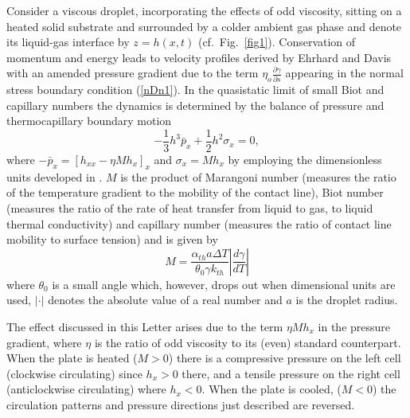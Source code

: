 \documentclass[%
 amsmath,amssymb,
 aps,
10.5pt]{revtex4-2}
\def\rr#1{(\ref{#1})}
\newcommand{\be}{\begin{equation}}
\newcommand{\ee}{\end{equation}}
\begin{document}
Consider a viscous droplet, incorporating the effects of odd viscosity, sitting on a heated solid substrate and 
surrounded by a colder ambient gas phase and denote its liquid-gas interface by $z=h(x,t)$ (cf.~Fig.~\ref{fig1}).    
Conservation of momentum and energy
leads to velocity profiles derived by Ehrhard and Davis \cite[Eq.~(4.11p)]{Ehrhard1991}
with an amended pressure gradient due to the term $\eta_o\frac{\partial \gamma}{\partial s}$
appearing in the normal stress boundary condition \rr{nDn1}. 
In the quasistatic limit of small Biot and capillary numbers 
the dynamics is determined by the balance of pressure and thermocapillary boundary
motion
\be\label{bal2}
-\frac{1}{3}h^3 \bar p_x + \frac{1}{2}h^2\sigma_x =0,
\ee
where 
$-\bar p_x=\left[ h_{xx} - \eta {M h_x}
\right]_x$ and $\sigma_x = Mh_x$ by employing the dimensionless units developed in \cite{Ehrhard1991}. 
$M$ is the product
of Marangoni number (measures the ratio of the temperature gradient to the mobility of the contact line),
Biot number (measures the ratio of 
the rate of heat transfer from liquid to gas, to liquid thermal conductivity) and capillary number (measures 
the ratio of contact line mobility to surface tension) and is given by 
\be
M =  \frac{ \alpha_{th}a\Delta T}{\theta_0\gamma k_{th}}\left|\frac{d \gamma}{dT}\right|
\ee
where $\theta_0$ is a small angle which, however, drops out when dimensional units are used, 
$|\cdot|$ denotes the absolute value of a real number and $a$ is the droplet radius.  

The effect discussed in this Letter arises due to the term 
$\eta M h_x$ in the pressure gradient, where $\eta$ is the ratio of odd viscosity to its (even) standard
counterpart.
When the plate is heated ($M>0$) there is a compressive pressure on the left cell
(clockwise circulating) since $h_x>0$ there, and a tensile pressure on the 
right cell (anticlockwise circulating) where $h_x<0$. 
When the plate is cooled, ($M<0$) the circulation patterns and pressure directions just described are 
reversed. 
\end{document}
